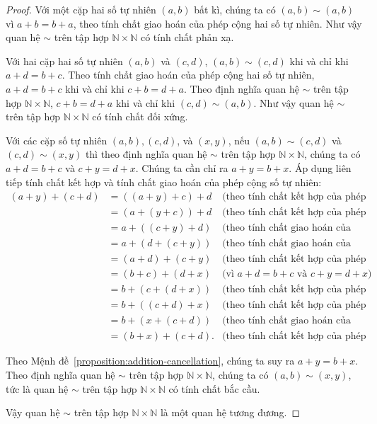 \begin{proof}
    Với một cặp hai số tự nhiên $(a, b)$ bất kì, chúng ta có $(a, b)\sim (a, b)$ vì $a + b = b + a$, theo tính chất giao hoán của phép cộng hai số tự nhiên. Như vậy quan hệ $\sim$ trên tập hợp $\mathbb{N}\times\mathbb{N}$ có tính chất phản xạ.

    Với hai cặp hai số tự nhiên $(a, b)$ và $(c, d)$, $(a, b)\sim (c, d)$ khi và chỉ khi $a + d = b + c$. Theo tính chất giao hoán của phép cộng hai số tự nhiên, $a + d = b + c$ khi và chỉ khi $c + b = d + a$. Theo định nghĩa quan hệ $\sim$ trên tập hợp $\mathbb{N}\times\mathbb{N}$, $c + b = d + a$ khi và chỉ khi $(c, d)\sim (a, b)$. Như vậy quan hệ $\sim$ trên tập hợp $\mathbb{N}\times\mathbb{N}$ có tính chất đối xứng.

    Với các cặp số tự nhiên $(a, b), (c, d)$, và $(x, y)$, nếu $(a, b)\sim (c, d)$ và $(c, d)\sim (x, y)$ thì theo định nghĩa quan hệ $\sim$ trên tập hợp $\mathbb{N}\times\mathbb{N}$, chúng ta có $a + d = b + c$ và $c + y = d + x$. Chúng ta cần chỉ ra $a + y = b + x$. Áp dụng liên tiếp tính chất kết hợp và tính chất giao hoán của phép cộng số tự nhiên:
    \begingroup
    \allowdisplaybreaks
    \begin{align*}
        (a + y) + (c + d) & = ((a + y) + c) + d  & \text{(theo tính chất kết hợp của phép cộng số tự nhiên)}   \\
                          & = (a + (y + c)) + d  & \text{(theo tính chất kết hợp của phép cộng số tự nhiên)}   \\
                          & = a + ((c + y) + d)  & \text{(theo tính chất giao hoán của phép cộng số tự nhiên)} \\
                          & = a + (d + (c + y))  & \text{(theo tính chất giao hoán của phép cộng số tự nhiên)} \\
                          & = (a + d) + (c + y)  & \text{(theo tính chất kết hợp của phép cộng số tự nhiên)}   \\
                          & = (b + c) + (d + x)  & \text{(vì $a + d = b + c$ và $c  + y = d + x$)}             \\
                          & = b + (c + (d + x))  & \text{(theo tính chất kết hợp của phép cộng số tự nhiên)}   \\
                          & = b + ((c + d) + x)  & \text{(theo tính chất kết hợp của phép cộng số tự nhiên)}   \\
                          & = b + (x + (c + d))  & \text{(theo tính chất giao hoán của phép cộng số tự nhiên)} \\
                          & = (b + x) + (c + d). & \text{(theo tính chất kết hợp của phép cộng số tự nhiên)}
    \end{align*}
    \endgroup

    Theo Mệnh đề~\ref{proposition:addition-cancellation}, chúng ta suy ra $a + y = b + x$. Theo định nghĩa quan hệ $\sim$ trên tập hợp $\mathbb{N}\times\mathbb{N}$, chúng ta có $(a, b)\sim (x, y)$, tức là quan hệ $\sim$ trên tập hợp $\mathbb{N}\times\mathbb{N}$ có tính chất bắc cầu.

    Vậy quan hệ $\sim$ trên tập hợp $\mathbb{N}\times\mathbb{N}$ là một quan hệ tương đương.
\end{proof}

